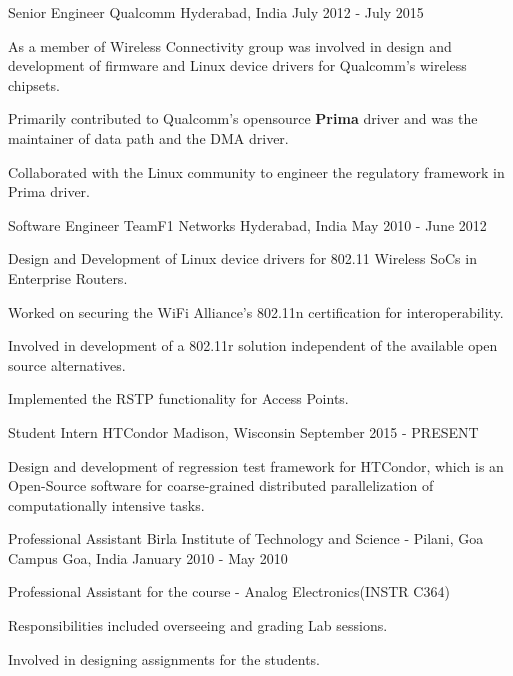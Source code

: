 \begin{cventries}
  \cventry
    {Senior Engineer}
    {Qualcomm}
    {Hyderabad, India}
    {July 2012 - July 2015}
    {
      \begin{cvitems}
        \item{As a member of Wireless Connectivity group was involved in 
              design and development of firmware and Linux device drivers 
              for Qualcomm's wireless chipsets.}
        \item{Primarily contributed to Qualcomm's opensource \textbf{Prima}
              driver and was the maintainer of data path and the DMA driver.}
        \item{Collaborated with the Linux community to engineer the regulatory 
              framework in Prima driver.}
      \end{cvitems}
    }

  \cventry
    {Software Engineer}
    {TeamF1 Networks}
    {Hyderabad, India}
    {May 2010 - June 2012}
    {
      \begin{cvitems}
        \item{Design and Development of Linux device drivers for 802.11 Wireless SoCs 
              in Enterprise Routers.}
        \item{Worked on securing the WiFi Alliance's 802.11n certification for 
              interoperability.}
        \item{Involved in development of a 802.11r solution independent of the available 
              open source alternatives.}
        \item{Implemented the RSTP functionality for Access Points.}
      \end{cvitems}
    }

  \cventry
    {Student Intern}
    {HTCondor}
    {Madison, Wisconsin}
    {September 2015 - PRESENT}
    {
      \begin{cvitems}
        \item{Design and development of regression test framework for HTCondor, which 
              is an Open-Source software for coarse-grained distributed parallelization 
              of computationally intensive tasks.}
      \end{cvitems}
    }

  \cventry
    {Professional Assistant}
    {Birla Institute of Technology and Science - Pilani, Goa Campus}
    {Goa, India}
    {January 2010 - May 2010}
    {
      \begin{cvitems}
        \item{Professional Assistant for the course - 
              Analog Electronics(INSTR C364)}
        \item{Responsibilities included overseeing and grading Lab sessions.}
        \item{Involved in designing assignments for the students.}
      \end{cvitems}
    }


\end{cventries}
